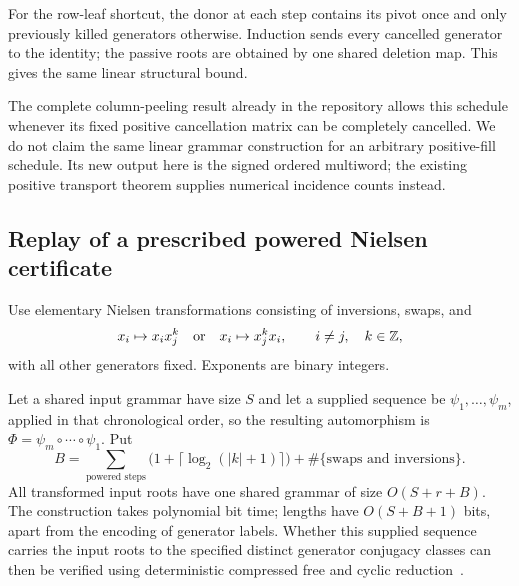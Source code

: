 For the row-leaf shortcut, the donor at each step contains its pivot once
and only previously killed generators otherwise. Induction sends every
cancelled generator to the identity; the passive roots are obtained by one
shared deletion map. This gives the same linear structural bound.

The complete column-peeling result already in the repository allows this
schedule whenever its fixed positive cancellation matrix can be completely
cancelled.  We do not claim the same linear grammar construction for an
arbitrary positive-fill schedule.  Its new output here is the signed ordered
multiword; the existing positive transport theorem supplies numerical
incidence counts instead.

\subsection{Replay of a prescribed powered Nielsen certificate}

Use elementary Nielsen transformations consisting of inversions, swaps, and
\[
 x_i\mapsto x_i x_j^k\quad\hbox{or}\quad
 x_i\mapsto x_j^k x_i,\qquad i\ne j,\quad k\in\mathbb Z,
\]
with all other generators fixed.  Exponents are binary integers.

\begin{proposition}
\label{prop:backward}
Let a shared input grammar have size $S$ and let a supplied sequence be
$\psi_1,\ldots,\psi_m$, applied in that chronological order, so the
resulting automorphism is $\Phi=\psi_m\circ\cdots\circ\psi_1$.
Put
\[
 B=\sum_{\text{powered steps}}\bigl(1+\lceil\log_2(|k|+1)\rceil\bigr)
   +\#\{\text{swaps and inversions}\}.
\]
All transformed input roots have one shared grammar of size $O(S+r+B)$.
The construction takes polynomial bit time; lengths have $O(S+B+1)$ bits,
apart from the encoding of generator labels. Whether this supplied sequence
carries the input roots to the specified distinct generator conjugacy
classes can then be verified using deterministic compressed free and
cyclic reduction~\cite{schleimer2008}.
\end{proposition}


